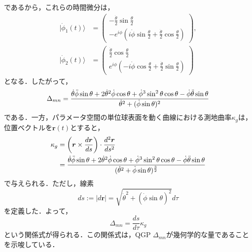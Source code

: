 \documentclass[a4paper, titlepage]{jsreport}
\begin{document}
であるから，これらの時間微分は，
\begin{align}
  |\Dot{\phi}_1(t) \rangle
  &= 
  \begin{pmatrix}
    -\frac{\Dot{\theta}}{2} \sin \frac{\theta}{2}\\
    -e^{i\phi} (i\Dot{\phi} \sin \frac{\theta}{2} + \frac{\Dot{\theta}}{2}\cos \frac{\theta}{2})
  \end{pmatrix},\\
  |\Dot{\phi}_2(t) \rangle
  &=
  \begin{pmatrix}
    \frac{\Dot{\theta}}{2} \cos \frac{\theta}{2}\\
    e^{i\phi} (-i\Dot{\phi} \cos \frac{\theta}{2} + \frac{\Dot{\theta}}{2}\sin \frac{\theta}{2})
  \end{pmatrix}
\end{align}
となる．したがって，
\begin{equation}
  \Delta_{mn} = \frac{\Dot{\theta} \Ddot{\phi} \sin \theta + 2 \Dot{\theta}^2 \Dot{\phi} \cos\theta + \Dot{\phi}^3 \sin^2\theta \cos \theta - \Dot{\phi} \Ddot{\theta} \sin \theta}{\Dot{\theta}^2 + (\Dot{\phi} \sin \theta)^2}
\end{equation}
である．一方，パラメータ空間の単位球表面を動く曲線における測地曲率$\kappa_g$は，位置ベクトルを$\bm{r}(t)$とすると，
\begin{align}
  \kappa_g 
  &= \left(\bm{r} \times \frac{d \bm{r}}{ds} \right) \cdot \frac{d^2 \bm{r}}{d s^2}\\
  &= \frac{\Dot{\theta} \Ddot{\phi} \sin \theta + 2 \Dot{\theta}^2 \Dot{\phi} \cos\theta + \Dot{\phi}^3 \sin^2\theta \cos \theta - \Dot{\phi} \Ddot{\theta} \sin \theta} {(\Dot{\theta}^2 + \Dot{\phi} \sin \theta)^{\frac{3}{2}}}
\end{align}
で与えられる．ただし，線素
\begin{equation}
  ds := |d\bm{r}| = \sqrt{\Dot{\theta}^2 + (\Dot{\phi} \sin \theta)^2}  d\tau
\end{equation}
を定義した．よって，
\begin{equation}
  \Delta_{mn} = \frac{ds}{d\tau} \kappa_g  
\end{equation}
という関係式が得られる．この関係式は，QGP $\Delta_{mn}$が幾何学的な量であることを示唆している．
\end{document}
